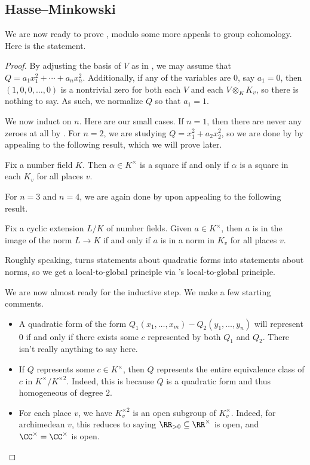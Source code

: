 \documentclass[../notes.tex]{subfiles}
\begin{document}
\subsection{Hasse--Minkowski}
We are now ready to prove , modulo some more appeals to group cohomology. Here is the statement.
\hmthm*
\begin{proof}
	By adjusting the basis of $V$ as in , we may assume that $Q=a_1x_1^2+\cdots+a_nx_n^2$. Additionally, if any of the variables are $0$, say $a_1=0$, then $(1,0,0,\ldots,0)$ is a nontrivial zero for both each $V$ and each $V\otimes_KK_v$, so there is nothing to say. As such, we normalize $Q$ so that $a_1=1$.

	We now induct on $n$. Here are our small cases. If $n=1$, then there are never any zeroes at all by . For $n=2$, we are studying $Q=x_1^2+a_2x_2^2$, so we are done by  by appealing to the following result, which we will prove later.
	\begin{theorem}
		Fix a number field $K$. Then $\alpha\in K^\times$ is a square if and only if $\alpha$ is a square in each $K_v$ for all places $v$.
	\end{theorem}
	For $n=3$ and $n=4$, we are again done by  upon appealing to the following result.
	\begin{theorem} \label{thm:hasse-norm}
		Fix a cyclic extension $L/K$ of number fields. Given $a\in K^\times$, then $a$ is in the image of the norm $L\to K$ if and only if $a$ is in a norm in $K_v$ for all places $v$.
	\end{theorem}
	Roughly speaking,  turns statements about quadratic forms into statements about norms, so we get a local-to-global principle via 's local-to-global principle.

	We are now almost ready for the inductive step. We make a few starting comments.
	\begin{itemize}
		\item A quadratic form of the form $Q_1(x_1,\ldots,x_m)-Q_2(y_1,\ldots,y_n)$ will represent $0$ if and only if there exists some $c$ represented by both $Q_1$ and $Q_2$. There isn't really anything to say here.
		\item If $Q$ represents some $c\in K^\times$, then $Q$ represents the entire equivalence class of $c$ in $K^\times/K^{\times2}$. Indeed, this is because $Q$ is a quadratic form and thus homogeneous of degree $2$.
		\item For each place $v$, we have $K_v^{\times2}$ is an open subgroup of $K_v^\times$. Indeed, for archimedean $v$, this reduces to saying $\RR_{>0}\subseteq\RR^\times$ is open, and $\CC^\times=\CC^\times$ is open.


\end{itemize}
\end{proof}
\end{document}
